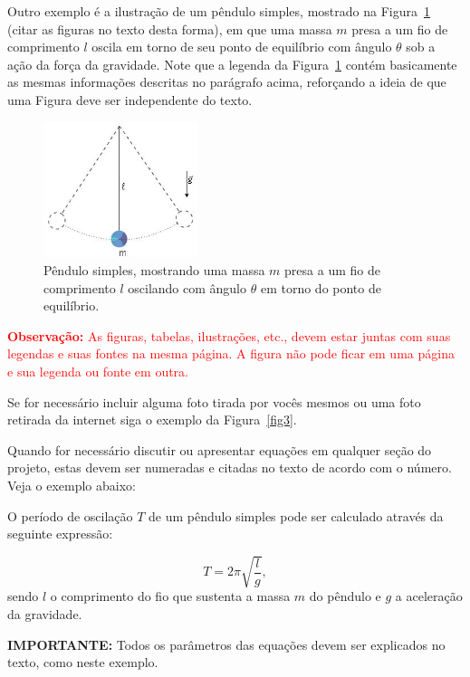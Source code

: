 \documentclass[12pt,oneside,brazil,hidelinks,article,sumario=tradicional,a4paper]{abntex2}
\begin{document}
Outro exemplo é a ilustração de um pêndulo simples, mostrado na Figura~\ref{fig2} {\color{red}(citar as figuras no texto desta forma)}, em que uma massa \(m\) presa a um fio de comprimento \(l\) oscila em torno de seu ponto de equilíbrio com ângulo \(\theta\) sob a ação da força da gravidade. Note que a legenda da Figura~\ref{fig2} contém basicamente as mesmas informações descritas no parágrafo acima, reforçando a ideia de que uma Figura deve ser independente do texto.

\begin{figure}[ht!]
  \centering
  \caption{Pêndulo simples, mostrando uma massa \(m\) presa a um fio de comprimento \(l\) oscilando com ângulo \(\theta\) em torno do ponto de equilíbrio.}\label{fig2}
  \includegraphics[width=0.4\textwidth]{pendulo.png}
\end{figure}

\textcolor{red}{\textbf{Observação:} As figuras, tabelas, ilustrações, etc., devem estar juntas com suas legendas e suas fontes na mesma página. A figura não pode ficar em uma página e sua legenda ou fonte em outra.}

Se for necessário incluir alguma foto tirada por vocês mesmos ou uma foto retirada da internet siga o exemplo da Figura~\ref{fig3}.

Quando for necessário discutir ou apresentar equações em qualquer seção do projeto, estas devem ser numeradas e citadas no texto de acordo com o número. Veja o exemplo abaixo:

O período de oscilação \(T\) de um pêndulo simples pode ser calculado através da seguinte expressão:

\begin{equation}\label{periodo}
    T = 2 \pi \sqrt{\dfrac{l}{g}},
\end{equation}
sendo $l$ o comprimento do fio que sustenta a massa $m$ do pêndulo e $g$ a aceleração da gravidade.

\noindent
{\textbf{\color{red}IMPORTANTE:} Todos os parâmetros das equações devem ser explicados no texto, como neste exemplo.}
\end{document}
